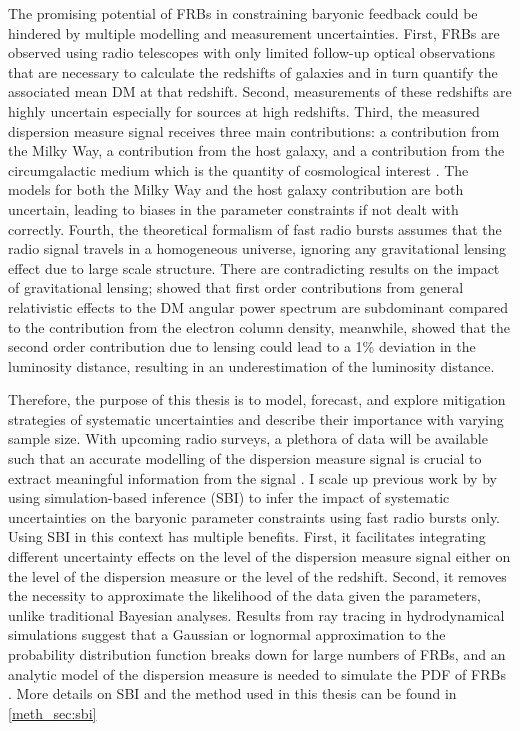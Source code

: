 The promising potential of FRBs in constraining baryonic feedback could be hindered by multiple modelling and measurement uncertainties. First, FRBs are observed using radio telescopes with only limited follow-up optical observations that are necessary to calculate the redshifts of galaxies and in turn quantify the associated mean DM at that redshift. Second, measurements of these redshifts are highly uncertain especially for sources at high redshifts. Third, the measured dispersion measure signal receives three main contributions: a contribution from the Milky Way, a contribution from the host galaxy, and a contribution from the circumgalactic medium which is the quantity of cosmological interest \citep{Reischke:2025srr}. The models for both the Milky Way and the host galaxy contribution are both uncertain, leading to biases in the parameter constraints if not dealt with correctly. Fourth, the theoretical formalism of fast radio bursts assumes that the radio signal travels in a homogeneous universe, ignoring any gravitational lensing effect due to large scale structure. There are contradicting results on the impact of gravitational lensing; \citet{alonso2021linear} showed that first order contributions from general relativistic effects to the DM angular power spectrum are subdominant compared to the contribution from the electron column density, meanwhile, \citet{Takahashi_2024} showed that the second order contribution due to lensing could lead to a 1\% deviation in the luminosity distance, resulting in an underestimation of the luminosity distance.

Therefore, the purpose of this thesis is to model, forecast, and explore mitigation strategies of systematic uncertainties and describe their importance with varying sample size. With upcoming radio surveys, a plethora of data will be available such that an accurate modelling of the dispersion measure signal is crucial to extract meaningful information from the signal \citep{LukeHoffmann_James_Glowacki_Prochaska_Gordon_Deller_Shannon_Ryder_2024}. I scale up previous work by \citet{Konar_Reischke_Hagstotz_Nicola_Hildebrandt_2025a} by using simulation-based inference (SBI) to infer the impact of systematic uncertainties on the baryonic parameter constraints using fast radio bursts only. Using SBI in this context has multiple benefits. First, it facilitates integrating different uncertainty effects on the level of the dispersion measure signal either on the level of the dispersion measure or the level of the redshift. Second, it removes the necessity to approximate the likelihood of the data given the parameters, unlike traditional Bayesian analyses. Results from ray tracing in hydrodynamical simulations \citep{Konietzka:2025kdr} suggest that a Gaussian or lognormal approximation to the probability distribution function breaks down for large numbers of FRBs, and an analytic model of the dispersion measure is needed to simulate the PDF of FRBs \citep{torkamani2026baryonification}. More details on SBI and the method used in this thesis can be found in \ref{meth_sec:sbi}


